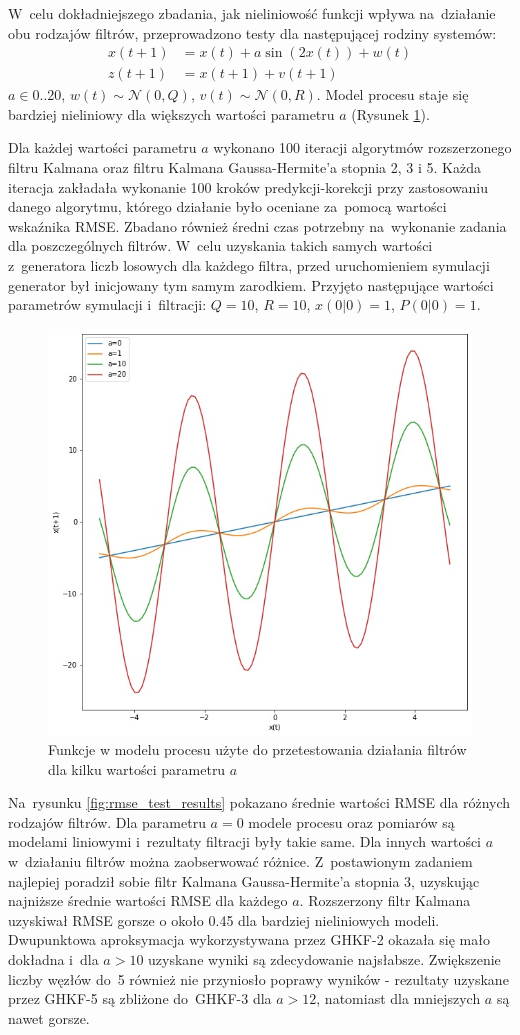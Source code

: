 \par


W~celu dokładniejszego zbadania, jak nieliniowość funkcji wpływa na~działanie obu rodzajów filtrów, przeprowadzono testy dla następującej rodziny systemów:
\begin{align}\label{eq:rmseTestModel}
x(t+1) &= x(t) + a\sin(2x(t)) + w(t) \nonumber \\
z(t+1) &= x(t+1) + v(t+1)
\end{align}
$a\in{0..20}$, $w(t) \sim \mathcal{N}(0, Q)$, $v(t) \sim \mathcal{N}(0, R)$. Model procesu staje się bardziej nieliniowy dla większych wartości parametru $a$ (Rysunek \ref{fig:rmse_test_functions}). \par
Dla każdej wartości parametru $a$ wykonano 100 iteracji algorytmów rozszerzonego filtru Kalmana oraz filtru Kalmana Gaussa-Hermite'a stopnia 2, 3 i 5. Każda iteracja zakładała wykonanie 100 kroków predykcji-korekcji przy zastosowaniu danego algorytmu, którego działanie było oceniane za~pomocą wartości wskaźnika RMSE. Zbadano również średni czas potrzebny na~wykonanie zadania dla poszczególnych filtrów. W~celu uzyskania takich samych wartości z~generatora liczb losowych dla każdego filtra, przed uruchomieniem symulacji generator był inicjowany tym samym zarodkiem. Przyjęto następujące wartości parametrów symulacji i~filtracji: $Q=10$, $R=10$, $x(0|0)=1$, $P(0|0)=1$. \par
\begin{figure}[h!]
	\centering
	\includegraphics[width=0.5\linewidth]{rmse_test_functions.jpg}
	\caption{Funkcje w modelu procesu użyte do przetestowania działania filtrów dla kilku wartości parametru $a$}
	\label{fig:rmse_test_functions}
\end{figure}
Na~rysunku \ref{fig:rmse_test_results} pokazano średnie wartości RMSE dla różnych rodzajów filtrów. Dla parametru $a=0$ modele procesu oraz pomiarów są modelami liniowymi i~rezultaty filtracji były takie same. Dla innych wartości $a$ w~działaniu filtrów można zaobserwować różnice. Z~postawionym zadaniem najlepiej poradził sobie filtr Kalmana Gaussa-Hermite'a stopnia 3, uzyskując najniższe średnie wartości RMSE dla każdego $a$. Rozszerzony filtr Kalmana uzyskiwał RMSE gorsze o około 0.45 dla bardziej nieliniowych modeli. Dwupunktowa aproksymacja wykorzystywana przez GHKF-2 okazała się mało dokładna i~dla $a>10$ uzyskane wyniki są zdecydowanie najsłabsze. Zwiększenie liczby węzłów do~5 również nie przyniosło poprawy wyników - rezultaty uzyskane przez GHKF-5 są zbliżone do~GHKF-3 dla $a>12$, natomiast dla mniejszych $a$ są nawet gorsze. \par

